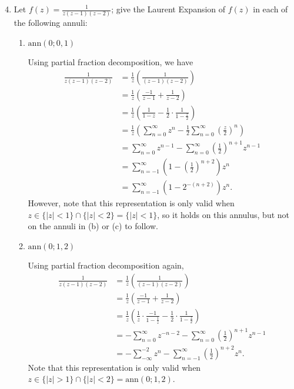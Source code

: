 \documentclass[11pt,oneside,english]{amsart}
\theoremstyle{definition}
\begin{document}
\begin{enumerate}
\setcounter{enumi}{3}

\item Let $\displaystyle f(z)=\frac{1}{z(z-1)(z-2)}$; give the Laurent Expansion of $f(z)$ in each of the following annuli:
\begin{enumerate}
\itemsep5mm
\item $\text{ann}(0;0,1)$

Using partial fraction decomposition, we have
\begin{align*}
\frac{1}{z(z-1)(z-2)}&=\frac{1}{z}\left(\frac{1}{(z-1)(z-2)}\right)\\[2mm]
&=\frac{1}{z}\left(\frac{-1}{z-1}+\frac{1}{z-2}\right)\\[2mm]
&=\frac{1}{z}\left(\frac{1}{1-z}-\frac{1}{2}\cdot\frac{1}{1-\frac{z}{2}}\right)\\[2mm]
&=\frac{1}{z}\left(\sum_{n=0}^\infty z^n-\frac{1}{2}\sum_{n=0}^\infty\left(\frac{z}{2}\right)^n\right)\\[2mm]
&=\sum_{n=0}^\infty z^{n-1}-\sum_{n=0}^\infty \left(\frac{1}{2}\right)^{n+1}z^{n-1}\\[2mm]
&=\sum_{n=-1}^\infty \left(1-\left(\frac{1}{2}\right)^{n+2}\right)z^n\\[2mm]
&=\sum_{n=-1}^\infty\left(1-2^{-(n+2)}\right)z^n.
\end{align*}
However, note that this representation is only valid when $z\in\{|z|<1\}\cap\{|z|<2\}=\{|z|<1\}$, so it holds on this annulus, but not on the annuli in (b) or (c) to follow.

\item $\text{ann}(0;1,2)$

Using partial fraction decomposition again,
\begin{align*}
\frac{1}{z(z-1)(z-2)}&=\frac{1}{z}\left(\frac{1}{(z-1)(z-2)}\right)\\[2mm]
&=\frac{1}{z}\left(\frac{-1}{z-1}+\frac{1}{z-2}\right)\\[2mm]
&=\frac{1}{z}\left(\frac{1}{z}\cdot\frac{-1}{1-\frac{1}{z}}-\frac{1}{2}\cdot\frac{1}{1-\frac{z}{2}}\right)\\[2mm]
&=-\sum_{n=0}^\infty z^{-n-2}-\sum_{n=0}^\infty\left(\frac{1}{2}\right)^{n+1}z^{n-1}\\[2mm]
&=-\sum_{-\infty}^{-2}z^n-\sum_{n=-1}^\infty\left(\frac{1}{2}\right)^{n+2}z^n.
\end{align*}
Note that this representation is only valid when $z\in\{|z|>1\}\cap\{|z|<2\}=\text{ann}(0;1,2)$.


\end{enumerate}
\end{enumerate}
\end{document}

